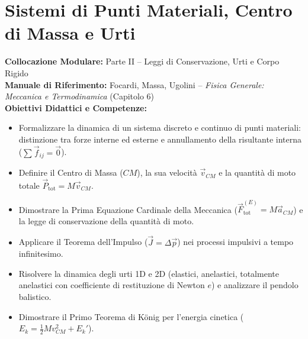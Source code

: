 \chapter{Sistemi di Punti Materiali, Centro di Massa e Urti}
\label{chap:sistemi_punti_urti}

\begin{tcolorbox}[enhanced, breakable, colback=navyblue!4!white, colframe=navyblue!80!black,
    coltitle=white, fonttitle=\bfseries\sffamily, title={Quadro Sinottico del Capitolo 06},
    sharp corners, rounded corners=south, boxrule=1pt]
\textbf{Collocazione Modulare:} Parte II -- Leggi di Conservazione, Urti e Corpo Rigido\\
\textbf{Manuale di Riferimento:} Focardi, Massa, Ugolini -- \emph{Fisica Generale: Meccanica e Termodinamica} (Capitolo 6)\\
\textbf{Obiettivi Didattici e Competenze:}\par
\begin{itemize}
    \item Formalizzare la dinamica di un sistema discreto e continuo di punti materiali: distinzione tra forze interne ed esterne e annullamento della risultante interna ($\sum \vec{f}_{ij} = \vec{0}$).
    \item Definire il Centro di Massa ($CM$), la sua velocità $\vec{v}_{CM}$ e la quantità di moto totale $\vec{P}_{\text{tot}} = M \vec{v}_{CM}$.
    \item Dimostrare la Prima Equazione Cardinale della Meccanica ($\vec{F}^{(E)}_{\text{tot}} = M \vec{a}_{CM}$) e la legge di conservazione della quantità di moto.
    \item Applicare il Teorema dell'Impulso ($\vec{J} = \Delta\vec{p}$) nei processi impulsivi a tempo infinitesimo.
    \item Risolvere la dinamica degli urti 1D e 2D (elastici, anelastici, totalmente anelastici con coefficiente di restituzione di Newton $e$) e analizzare il pendolo balistico.
    \item Dimostrare il Primo Teorema di König per l'energia cinetica ($E_k = \frac{1}{2}M v_{CM}^2 + E_k'$).
\end{itemize}
\end{tcolorbox}

\vspace{0.5em}

